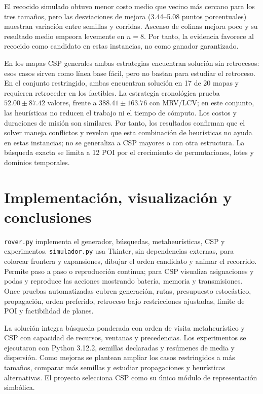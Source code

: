 \documentclass[10pt,spanish]{article}
\begin{document}
El recocido simulado obtuvo menor costo medio que vecino más cercano para los tres tamaños, pero las desviaciones de mejora (3.44--5.08 puntos porcentuales) muestran variación entre semillas y corridas. Ascenso de colinas mejora poco y su resultado medio empeora levemente en $n=8$. Por tanto, la evidencia favorece al recocido como candidato en estas instancias, no como ganador garantizado.

En los mapas CSP generales ambas estrategias encuentran solución sin retrocesos: esos casos sirven como línea base fácil, pero no bastan para estudiar el retroceso. En el conjunto restringido, ambas encuentran solución en 17 de 20 mapas y requieren retroceder en los factibles. La estrategia cronológica prueba $52.00\pm87.42$ valores, frente a $388.41\pm163.76$ con MRV/LCV; en este conjunto, las heurísticas no reducen el trabajo ni el tiempo de cómputo. Los costos y duraciones de misión son similares. Por tanto, los resultados confirman que el solver maneja conflictos y revelan que esta combinación de heurísticas no ayuda en estas instancias; no se generaliza a CSP mayores o con otra estructura. La búsqueda exacta se limita a 12 POI por el crecimiento de permutaciones, lotes y dominios temporales.

\section{Implementación, visualización y conclusiones}
\texttt{rover.py} implementa el generador, búsquedas, metaheurísticas, CSP y experimentos. \texttt{simulador.py} usa Tkinter, sin dependencias externas, para colorear frontera y expansiones, dibujar el orden candidato y animar el recorrido. Permite paso a paso o reproducción continua; para CSP visualiza asignaciones y podas y reproduce las acciones mostrando batería, memoria y transmisiones. Once pruebas automatizadas cubren generación, rutas, presupuesto estocástico, propagación, orden preferido, retroceso bajo restricciones ajustadas, límite de POI y factibilidad de planes.

La solución integra búsqueda ponderada con orden de visita metaheurístico y CSP con capacidad de recursos, ventanas y precedencias. Los experimentos se ejecutaron con Python 3.12.2, semillas declaradas y resúmenes de media y dispersión. Como mejoras se plantean ampliar los casos restringidos a más tamaños, comparar más semillas y estudiar propagaciones y heurísticas alternativas. El proyecto selecciona CSP como su único módulo de representación simbólica.
\end{document}
